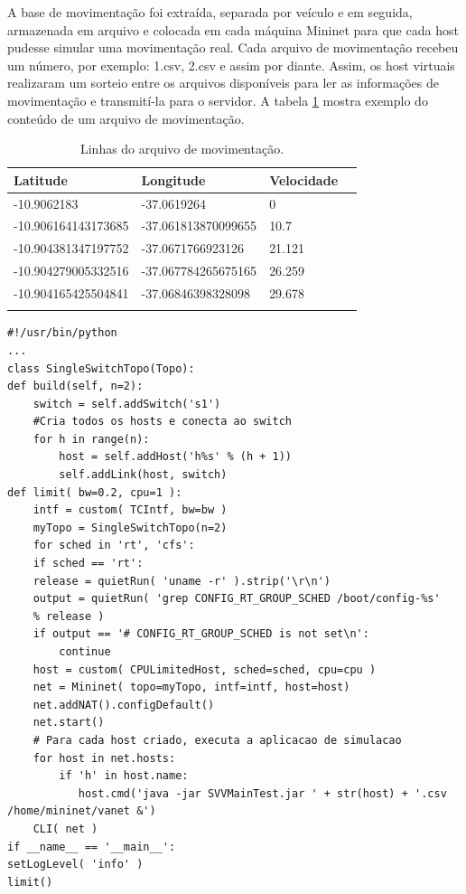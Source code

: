 \documentclass[
	12pt,				%
	oneside,			%
	a4paper,			%
	english,			%
	brazil				%
	]{abntex2ppgsi}
\begin{document}
A base de movimentação foi extraída, separada por veículo e em seguida, armazenada em arquivo e colocada em cada máquina Mininet para que cada host pudesse simular uma  movimentação real. Cada arquivo de movimentação recebeu um número, por exemplo: 1.csv, 2.csv e assim por diante. Assim, os host virtuais realizaram um sorteio entre os arquivos disponíveis para ler as informações de movimentação e transmití-la para o servidor. A tabela \ref{tab:linhasArquivoMovimentacao} mostra exemplo do conteúdo de um arquivo de movimentação.


\begin{longtable}{ p{}  p{}   p{}  p{}} 
	\hline
	\rowcolor[gray]{0.7}
	Latitude	& Longitude	& Velocidade \\ \hline
	-10.9062183	& -37.0619264& 0 \\ \hline
	-10.906164143173685 & -37.061813870099655 & 10.7	\\ \hline	
	-10.904381347197752 & -37.0671766923126 & 21.121 \\ \hline
	-10.904279005332516  & -37.067784265675165 & 26.259 \\ \hline
	-10.904165425504841 & -37.06846398328098 & 29.678 \\ \hline
	\caption{Linhas do arquivo de movimentação.} 
	\label{tab:linhasArquivoMovimentacao}
\end{longtable}
\newpage
\begin{lstlisting}[caption=Script Python para criação dos hosts no mininet., label=src:python]
#!/usr/bin/python
...
class SingleSwitchTopo(Topo):
def build(self, n=2):
    switch = self.addSwitch('s1')
    #Cria todos os hosts e conecta ao switch
    for h in range(n):	
		host = self.addHost('h%s' % (h + 1))
		self.addLink(host, switch)
def limit( bw=0.2, cpu=1 ):
	intf = custom( TCIntf, bw=bw )
	myTopo = SingleSwitchTopo(n=2)
	for sched in 'rt', 'cfs':
	if sched == 'rt':
	release = quietRun( 'uname -r' ).strip('\r\n')
	output = quietRun( 'grep CONFIG_RT_GROUP_SCHED /boot/config-%s'
	% release )
	if output == '# CONFIG_RT_GROUP_SCHED is not set\n':
		continue
	host = custom( CPULimitedHost, sched=sched, cpu=cpu )
	net = Mininet( topo=myTopo, intf=intf, host=host)
	net.addNAT().configDefault()
	net.start()
	# Para cada host criado, executa a aplicacao de simulacao
	for host in net.hosts:
		if 'h' in host.name:
		   host.cmd('java -jar SVVMainTest.jar ' + str(host) + '.csv /home/mininet/vanet &')
	CLI( net )
if __name__ == '__main__':
setLogLevel( 'info' )
limit()
\end{lstlisting}
\end{document}

